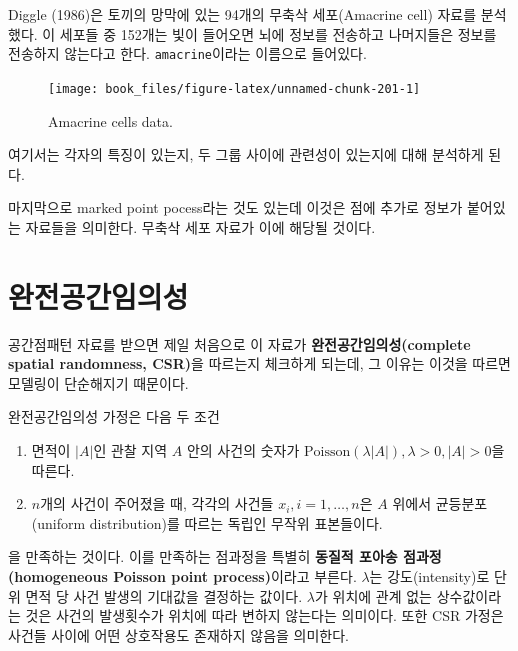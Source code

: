 \documentclass[b5paper,]{book}
\theoremstyle{definition}
\theoremstyle{definition}
\theoremstyle{definition}
\theoremstyle{remark}
\let\BeginKnitrBlock\begin \let\EndKnitrBlock\end
\begin{document}
Diggle (1986)은 토끼의 망막에 있는 94개의 무축삭 세포(Amacrine cell)
자료를 분석했다. 이 세포들 중 152개는 빛이 들어오면 뇌에 정보를 전송하고
나머지들은 정보를 전송하지 않는다고 한다. \texttt{amacrine}이라는
이름으로 들어있다.

\begin{figure}

{\centering \texttt{[image: book\_files/figure-latex/unnamed-chunk-201-1]} 

}

\caption{Amacrine cells data.}\label{fig:unnamed-chunk-201}
\end{figure}

여기서는 각자의 특징이 있는지, 두 그룹 사이에 관련성이 있는지에 대해
분석하게 된다.

마지막으로 marked point pocess라는 것도 있는데 이것은 점에 추가로 정보가
붙어있는 자료들을 의미한다. 무축삭 세포 자료가 이에 해당될 것이다.

\chapter{완전공간임의성}\label{csr}

공간점패턴 자료를 받으면 제일 처음으로 이 자료가
\textbf{완전공간임의성(complete spatial randomness, CSR)}을 따르는지
체크하게 되는데, 그 이유는 이것을 따르면 모델링이 단순해지기 때문이다.

\BeginKnitrBlock{definition}[동질적 포아송 점과정]
\protect\hypertarget{def:unnamed-chunk-202}{}{\label{def:unnamed-chunk-202}
{} }완전공간임의성 가정은 다음 두
조건

\begin{enumerate}
\def\labelenumi{\arabic{enumi}.}
\item
  면적이 \(|A|\)인 관찰 지역 \(A\) 안의 사건의 숫자가
  \(\text{Poisson}(\lambda |A|), \lambda >0, |A| >0\)을 따른다.
\item
  \(n\)개의 사건이 주어졌을 때, 각각의 사건들
  \(x_{i}, i=1,\ldots , n\)은 \(A\) 위에서 균등분포(uniform
  distribution)를 따르는 독립인 무작위 표본들이다.
\end{enumerate}

을 만족하는 것이다. 이를 만족하는 점과정을 특별히 \textbf{동질적 포아송
점과정(homogeneous Poisson point process)}이라고 부른다. \(\lambda\)는
강도(intensity)로 단위 면적 당 사건 발생의 기대값을 결정하는 값이다.
\(\lambda\)가 위치에 관계 없는 상수값이라는 것은 사건의 발생횟수가
위치에 따라 변하지 않는다는 의미이다. 또한 CSR 가정은 사건들 사이에 어떤
상호작용도 존재하지 않음을 의미한다.
\EndKnitrBlock{definition}
\end{document}
